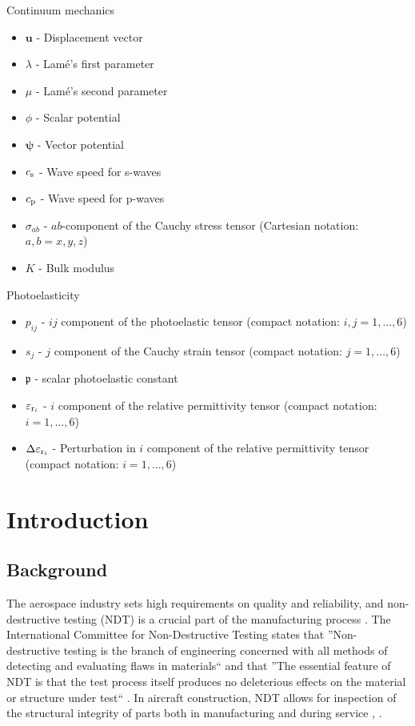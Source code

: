 \documentclass[11pt,twoside]{eitExjobb}
\begin{document}
		Continuum mechanics
		\begin{itemize}
			\item $\bm{u}$ - Displacement vector
			\item $\lambda$ - Lamé's first parameter
			\item $\mu$ - Lamé's second parameter
			\item $\phi$ - Scalar potential
			\item $\bm{\psi}$ - Vector potential
			\item $c_{\mathrm{s}}$ - Wave speed for s-waves
			\item $c_{\mathrm{p}}$ - Wave speed for p-waves
			\item $\sigma_{ab}$ - $ab$-component of the Cauchy stress tensor (Cartesian notation: $a,b = x,y,z$)
			\item $K$ - Bulk modulus
		\end{itemize}
		Photoelasticity
		\begin{itemize}
			\item $p_{ij}$ - $ij$ component of the photoelastic tensor (compact notation: $i,j = 1,\dotsc,6$)
			\item $s_j$ - $j$ component of the Cauchy strain tensor (compact notation: $j = 1,\dotsc,6$)
			\item $\mathfrak{p}$ - scalar photoelastic constant
			\item $\varepsilon_{\mathrm{r}_i}$ - $i$ component of the relative permittivity tensor (compact notation: $i = 1,\dotsc,6$)
			\item $\Delta \varepsilon_{\mathrm{r}_i}$ - Perturbation in $i$ component of the relative permittivity tensor (compact notation: $i = 1,\dotsc,6$)
		\end{itemize}
	
	\cleardoublepage
	
	\mainmatter		%
	
	\chapter{Introduction \label{ch:intro}}
	
	\section{Background}
	The aerospace industry sets high requirements on quality and reliability, and non-destructive testing (NDT) is a crucial part of the manufacturing process \cite{Saha2016}. The International Committee for Non-Destructive Testing states that ''Non-destructive testing is the branch of engineering concerned with all methods of detecting and evaluating flaws in materials`` and that ''The essential feature of NDT is that the test process itself produces no deleterious effects on the material or structure under test`` \cite{ICNDT2006}. In aircraft construction, NDT allows for inspection of the structural integrity of parts both in manufacturing and during service \cite{Saha2016}, \cite{Garnier2011}.
	
\end{document}
